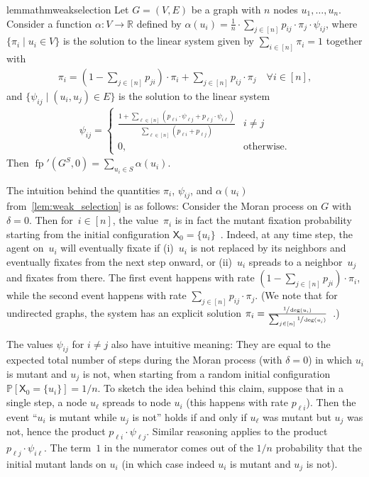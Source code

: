 \documentclass[letterpaper]{article}
\def\Pr{\mathbb{P}}
\def\R{\mathbb{R}}
\newcommand{\X}{\mathsf{X}}
\newcommand{\fp}{\operatorname{fp}}
\newcommand{\FitAdv}{\delta}
\begin{document}
\begin{restatable}{lemma}{thmweakselection}\label{lem:weak_selection}
Let $G=(V,E)$ be a graph with $n$ nodes $u_1,\dots,u_n$. %
 Consider a function $\alpha\colon V\to\R$ defined by $\alpha(u_i) =  \frac{1}{n}\cdot \sum_{j\in[n]} p_{ij} \cdot \pi_j\cdot \psi_{ij}$,
where $\{\pi_i\mid u_i\in V\}$ is the solution to the linear system
given by $\sum_{i\in [n]} \pi_i=1$ together with
\begin{align}
\pi_i= \left(1-\sum_{j\in[n]} p_{ji}\right)\cdot \pi_i +\sum_{j\in[n]} p_{ij}\cdot \pi_j\quad\forall i\in[n],
\label{eq:pi2}
\end{align}
and $\{\psi_{ij} \mid (u_i,u_j)\in E\}$ is the solution to the linear system
\begin{align}
\psi_{ij}=
\begin{cases}
\frac{1+\sum_{\ell\in[n]}\left(p_{\ell i}\cdot \psi_{\ell j} + p_{\ell j}\cdot \psi_{i\ell}\right)}{\sum_{\ell\in[n]}\left(p_{\ell i}+p_{\ell j}\right)} & i\neq j %
\\
0, & \text{otherwise}.
\end{cases}
\label{eq:psi}
\end{align}
Then $\fp'(G^S,0)=\sum_{u_i\in S} \alpha(u_i)$.
\end{restatable}

The intuition behind the quantities $\pi_i$, $\psi_{ij}$, and $\alpha(u_i)$ from~\cref{lem:weak_selection} is as follows:
Consider the Moran process on $G$ with $\FitAdv=0$.
Then for~$i\in[n]$, the value~$\pi_i$ is in fact the mutant fixation probability
starting from the initial configuration $\X_0=\{u_i\}$~\cite{Allen2021}.
Indeed, at any time step, the agent on~$u_i$ will eventually fixate if
(i)~$u_i$ is not replaced by its neighbors and eventually fixates from the next step onward, or
(ii)~$u_i$ spreads to a neighbor~$u_j$ and fixates from there.
The first event happens with rate $(1-\sum_{j\in[n]}p_{ji})\cdot\pi_i $, 
while the second event happens with rate $\sum_{j\in[n]} p_{ij}\cdot \pi_j$.
(We note that for undirected graphs, the system has an explicit solution
$\pi_i = \frac{\sfrac{1}{\deg(u_i)}}{\sum_{j\in[n]}\sfrac{1}{\deg(u_j)}}$~\cite{Broom2010}.)

The values $\psi_{ij}$ for
$i\ne j$
also have intuitive meaning:
They are equal to the expected total number of steps during the Moran process (with $\FitAdv=0$)
in which $u_i$ is mutant and $u_j$ is not, 
when starting from a random initial configuration $\Pr[\X_0=\{u_i\}]=1/n$.
To sketch the idea behind this claim,
suppose that in a single step, a node $u_\ell$ spreads to node $u_i$
(this happens with rate $p_{\ell i}$).
Then the event ``$u_i$ is mutant while $u_j$ is not'' holds
if and only if $u_\ell$ was mutant but $u_j$ was not, hence the product $p_{\ell i}\cdot \psi_{\ell j}$.
Similar reasoning applies to the product $p_{\ell j}\cdot \psi_{i\ell}$.
The term~$1$ in the numerator comes out of the $1/n$ probability that the initial mutant lands on $u_i$ (in which case indeed $u_i$ is mutant and $u_j$ is not).
\end{document}
